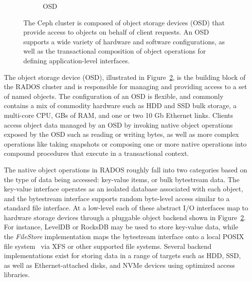 \documentclass[10pt,twocolumn]{article}
\begin{document}
\begin{figure}[t]
\begin{subfigure}[b]{.40\linewidth}
      \caption{OSD}
      \label{fig:osd}
  \end{subfigure}
  \caption{The Ceph cluster is composed of object storage devices (OSD) that
  provide access to objects on behalf of client requests. An OSD supports a
    wide variety of hardware and software configurations, as well as the
    transactional composition of object operations for defining
    application-level interfaces.}
\end{figure}

The object storage device (OSD), illustrated in Figure~\ref{fig:osd}, is the
building block of the RADOS cluster and is responsible for managing and
providing access to a set of
named objects. The configuration of an OSD is flexible, and commonly contains
a mix of commodity hardware such as HDD and SSD bulk storage, a multi-core
CPU, GBs of RAM, and one or two 10 Gb Ethernet links. Clients access object
data managed by an OSD by invoking native object operations exposed by the OSD
such as reading or writing bytes, as well as more complex operations like taking
snapshots or composing one or more native operations into compound procedures
that execute in a transactional context.

The native object operations in RADOS roughly fall into two categories based
on the type of data being accessed: key-value items, or bulk bytestream data.
The key-value interface operates as an isolated database associated with each
object, and the bytestream interface supports random byte-level access similar
to a standard file interface.  At a low-level each of these abstract I/O
interfaces map to hardware storage devices through a pluggable object backend
shown in Figure~\ref{fig:osd}. For instance, LevelDB or RocksDB may be used to
store key-value data, while the \emph{FileStore} implementation maps the
bytestream interface onto a local POSIX file system~\cite{leveldb,rocksdb} via
XFS or other supported file systems. Several backend implementations exist for
storing data in a range of targets such as HDD, SSD, as well as
Ethernet-attached disks, and NVMe devices using optimized access libraries.

\end{document}
